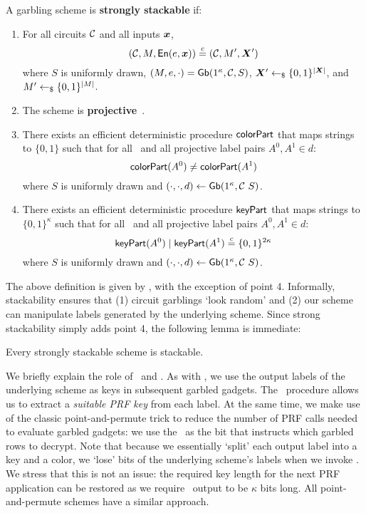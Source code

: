 \begin{definition}\label{def:stackable}
  A garbling scheme is \textbf{strongly stackable} if:
  \begin{enumerate}
    \item
      For
      all circuits $\mathcal C$
      and all inputs $\cirinp$,
      \[
        (\cir, \mat, \gEn(e, \cirinp)) \indist (\cir, \mat', \gcirinp')
      \]
      where
      $S$ is uniformly drawn,
      $(M, e, \cdot) = \textsf{Gb}(1^\kappa, \mathcal C, S)$,
      $\gcirinp' \drawnfrom{} \{0, 1\}^{|\gcirinp|}$,
      and $M' \gets_{\$} \{0, 1\}^{|M|}$.
    \item
      The scheme is \textbf{projective}~\cite{CCS:BelHoaRog12}.
    \item
      There exists an efficient deterministic procedure $\textsf{colorPart}$ that
      maps strings to $\{0, 1\}$ such that for all \cir\ and all
      projective label pairs $A^0, A^1 \in d$:
      \[
        \textsf{colorPart}(A^0) \neq \textsf{colorPart}(A^1)
      \]
      where $S$ is uniformly drawn and $(\cdot, \cdot, d) \gets \textsf{Gb}(1^\kappa, \mathcal C\ S)$.
    \item
      There exists an efficient deterministic procedure $\textsf{keyPart}$ that
      maps strings to $\{0, 1\}^\kappa$ such that for all \cir\ and all
      projective label pairs $A^0, A^1 \in d$:
      \[
        \textsf{keyPart}(A^0) \mid \textsf{keyPart}(A^1) \overset{c}{=} \{0, 1\}^{2\kappa}
      \]
      where $S$ is uniformly drawn and $(\cdot, \cdot, d) \gets \textsf{Gb}(1^\kappa, \mathcal C\ S)$.
  \end{enumerate}
\end{definition}

The above definition is given by \HK, with the exception of point 4.
Informally, stackability ensures that (1) circuit garblings `look
random' and (2) our scheme can manipulate labels generated by the
underlying scheme.
Since strong stackability simply adds point 4, the following lemma is
immediate:
\begin{lemma}
  Every strongly stackable scheme is stackable.
\end{lemma}

We briefly explain the role of \lcolor\ and \lkey. As with \HK, we
use the output labels of the underlying scheme as keys in subsequent
garbled gadgets.  The \lkey\ procedure allows us to extract a
\emph{suitable PRF key} from each label. At the same time, we make use
of the classic point-and-permute trick to reduce the number of PRF calls
needed to evaluate garbled gadgets: we use the \lcolor\ as the bit
that instructs which garbled rows to decrypt.  Note that because we
essentially `split’ each output label into a key and a color, we
`lose’ bits of the underlying scheme’s labels when we invoke
\lkey. We stress that this is not an issue: the required key
length for the next PRF application can be restored as we require
\lkey\ output to be $\kappa$ bits long. All point-and-permute schemes
have a similar approach.

